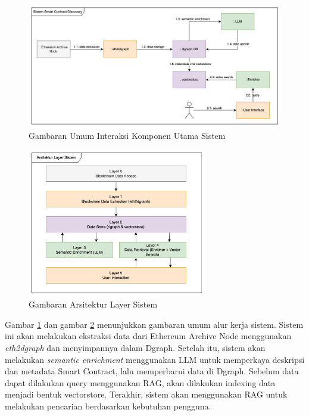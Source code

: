 \begin{figure}[ht]
	\centering
	\includegraphics[width=1\textwidth]{resources/chapter-3/komponen-utama-new.png}
	\caption{Gambaran Umum Interaksi Komponen Utama Sistem}
	\label{image:komponen-sistem}
\end{figure}

\begin{figure}[ht]
	\centering
	\includegraphics[width=0.7\textwidth]{resources/chapter-3/layer-arsitektur-new.png}
	\caption{Gambaran Arsitektur Layer Sistem}
	\label{image:layer-arsitektur}
\end{figure}


Gambar \ref{image:komponen-sistem} dan gambar \ref{image:layer-arsitektur} menunjukkan gambaran umum alur kerja sistem. Sistem ini akan melakukan ekstraksi data dari Ethereum Archive Node menggunakan \textit{eth2dgraph} dan menyimpannya dalam Dgraph. Setelah itu, sistem akan melakukan \textit{semantic enrichment} menggunakan LLM untuk memperkaya deskripsi dan metadata Smart Contract, lalu memperbarui data di Dgraph. Sebelum data dapat dilakukan query menggunakan RAG, akan dilakukan indexing data menjadi bentuk vectorstore. Terakhir, sistem akan menggunakan RAG untuk melakukan pencarian berdasarkan kebutuhan pengguna. 



